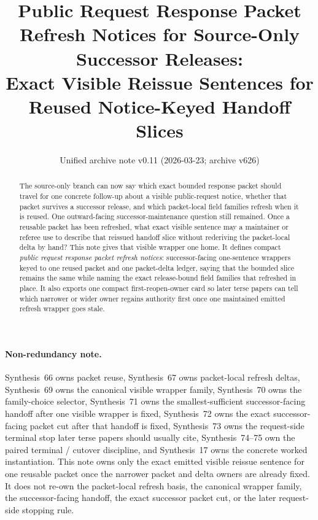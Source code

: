 \documentclass[11pt]{article}
\title{Public Request Response Packet Refresh Notices for Source-Only Successor Releases:\\[0.5ex]
\large Exact Visible Reissue Sentences for Reused Notice-Keyed Handoff Slices}
\author{}
\date{Unified archive note v0.11 (2026-03-23; archive v626)}
\begin{document}
\maketitle

\begin{abstract}
The source-only branch can now say which exact bounded response packet should travel for one concrete follow-up about a visible public-request notice, whether that packet survives a successor release, and which packet-local field families refresh when it is reused. One outward-facing successor-maintenance question still remained. Once a reusable packet has been refreshed, what exact visible sentence may a maintainer or referee use to describe that reissued handoff slice without rederiving the packet-local delta by hand? This note gives that visible wrapper one home. It defines compact \emph{public request response packet refresh notices}: successor-facing one-sentence wrappers keyed to one reused packet and one packet-delta ledger, saying that the bounded slice remains the same while naming the exact release-bound field families that refreshed in place. It also exports one compact first-reopen-owner card so later terse papers can tell which narrower or wider owner regains authority first once one maintained emitted refresh wrapper goes stale.
\end{abstract}

\paragraph{Non-redundancy note.}
Synthesis~66 owns packet reuse, Synthesis~67 owns packet-local refresh deltas, Synthesis~69 owns the canonical visible wrapper family, Synthesis~70 owns the family-choice selector, Synthesis~71 owns the smallest-sufficient successor-facing handoff after one visible wrapper is fixed, Synthesis~72 owns the exact successor-facing packet cut after that handoff is fixed, Synthesis~73 owns the request-side terminal stop later terse papers should usually cite, Synthesis~74--75 own the paired terminal / cutover discipline, and Synthesis~17 owns the concrete worked instantiation.\cite{series:publicrequestresponsepacketcarryforward,series:publicrequestresponsepacketdeltas,series:publicrequestresponsepacketrefreshnoticenormalforms,series:publicrequestresponsepacketrefreshnoticeselections,series:publicrequestresponsepacketrefreshresponsemenus,series:publicrequestresponsepacketrefreshresponsepackets,series:publicrequestresponsepacketrefreshresponsepacketclosureverdicts,series:pairedterminalcitationdiscipline,series:pairedterminalcutoverrule,series:workedexample}
This note owns only the exact emitted visible reissue sentence for one reusable packet once the narrower packet and delta owners are already fixed. It does not re-own the packet-local refresh basis, the canonical wrapper family, the successor-facing handoff, the exact successor packet cut, or the later request-side stopping rule.
\end{document}
